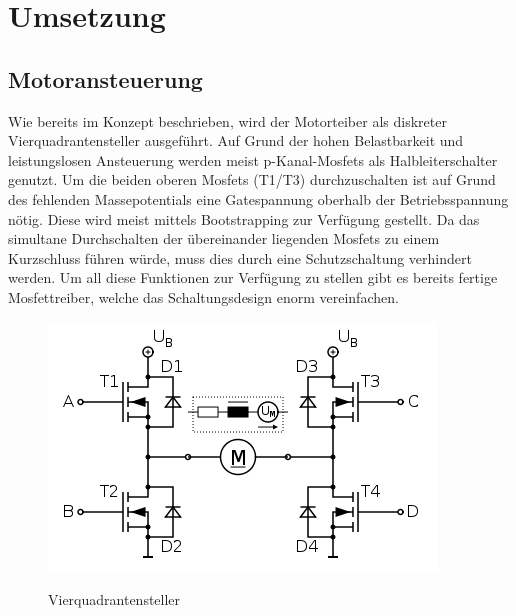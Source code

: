 \chapter{Umsetzung}

\section{Motoransteuerung}
Wie bereits im Konzept beschrieben, wird der Motorteiber als diskreter Vierquadrantensteller ausgeführt. Auf Grund der hohen Belastbarkeit
und leistungslosen Ansteuerung werden meist p-Kanal-Mosfets als Halbleiterschalter genutzt. Um die beiden oberen Mosfets (T1/T3) durchzuschalten
ist auf Grund des fehlenden Massepotentials eine Gatespannung oberhalb der Betriebsspannung nötig. Diese wird meist mittels Bootstrapping zur
Verfügung gestellt. Da das simultane Durchschalten der übereinander liegenden Mosfets zu einem Kurzschluss führen würde, muss dies durch
eine Schutzschaltung verhindert werden. Um all diese Funktionen zur Verfügung zu stellen gibt es bereits fertige Mosfettreiber,
welche das Schaltungsdesign enorm vereinfachen.

\begin{figure}[H]
\centering
\includegraphics[width=.8\textwidth]{Vierquadrantensteller.png}\\
\caption{Vierquadrantensteller \cite{vierquadrantensteller}}%
\label{fig:Vierquadrantensteller}
\end{figure}

